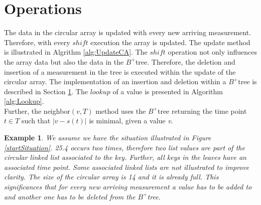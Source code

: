 \documentclass[abstracton,12pt]{scrreprt}
\newtheorem{example}{Example}
\begin{document}
\newpage
\section{Operations}
\label{sec:OperationsOnBTree}
The data in the circular array is updated with every new arriving measurement. Therefore, with every $shift$ execution the array is updated. The update method is illustrated in Algrithm \ref{alg:UpdateCA}. The $shift$ operation not only influences the array data but also the data in the $B^+$tree. Therefore, the deletion and insertion of a measurement in the tree is executed within the update of the circular array. The implementation of an insertion and deletion within a $B^+$tree is described in Section \ref{sec:OperationsOnBTree}. The $lookup$ of a value is presented in Algorithm \ref{alg:Lookup}.
\\Further, the neighbor$(v,T)$ method uses the $B^+$tree returning the time point $t \in T$ such that $|v-s(t)|$ is minimal, given a value \emph{v}.

\begin{example}
We assume we have the situation illustrated in Figure \ref{startSituation}. 25.4 occurs two times, therefore two list values are part of the circular linked list associated to the key. Further, all keys in the leaves have an associated time point. Some associated linked lists are not illustrated to improve clarity. The size of the circular array is 14 and it is already full. This significances that for every new arriving measurement a value has to be added to and another one has to be deleted from the $B^+$tree. 
\end{example}
\end{document}
